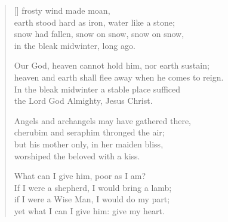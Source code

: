 \newHymn
{}

\begin{verse}[\versewidth]
 frosty wind made moan,\\
earth stood hard as iron, water like a stone;\\
snow had fallen, snow on snow, snow on snow,\\
in the bleak midwinter, long ago.

Our God, heaven cannot hold him, nor earth sustain;\\
heaven and earth shall flee away when he comes to reign.\\
In the bleak midwinter a stable place sufficed\\
the Lord God Almighty, Jesus Christ.

Angels and archangels may have gathered there,\\
cherubim and seraphim thronged the air;\\
but his mother only, in her maiden bliss,\\
worshiped the beloved with a kiss.

What can I give him, poor as I am?\\
If I were a shepherd, I would bring a lamb;\\
if I were a Wise Man, I would do my part;\\
yet what I can I give him: give my heart.

\end{verse}


